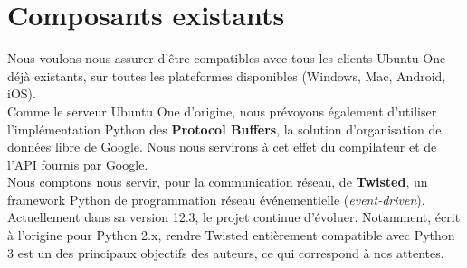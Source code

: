 \section{Composants existants}
\thispagestyle{EIP} %
Nous voulons nous assurer d'être compatibles avec tous les clients Ubuntu One déjà existants, sur toutes les plateformes disponibles (Windows, Mac, Android, iOS).\\

Comme le serveur Ubuntu One d'origine, nous prévoyons également d'utiliser l'implémentation Python des \textbf{Protocol Buffers}, la solution d'organisation de données libre de Google. Nous nous servirons à cet effet du compilateur et de l'API fournis par Google.\\

Nous comptons nous servir, pour la communication réseau, de \textbf{Twisted}, un framework Python de programmation réseau événementielle (\emph{event-driven}). Actuellement dans sa version 12.3, le projet continue d'évoluer. Notamment, écrit à l'origine pour Python 2.x, rendre Twisted entièrement compatible avec Python 3 est un des principaux objectifs des auteurs, ce qui correspond à nos attentes.

